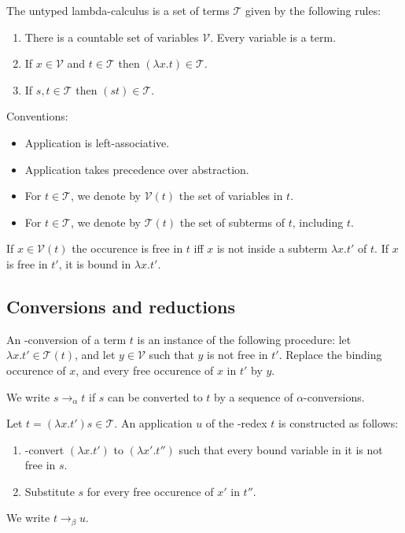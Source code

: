 \documentclass{article}
\begin{document}
\begin{definition}
	\label{untyped lcalc}
	The untyped lambda-calculus is a set of terms $\mathcal{T}$ given by the following rules:
	\begin{enumerate}[label=L\arabic*.]
		\item There is a countable set of variables $\mathcal{V}$. Every variable is a term.
		\item If $x\in\mathcal{V}$ and $t\in\mathcal{T}$ then $(\lambda x.t)\in\mathcal{T}$.
		\item \label{l3a} If $s,t\in\mathcal{T}$ then $(st)\in\mathcal{T}$.
	\end{enumerate}	
	Conventions:
	\begin{itemize}
		\item Application is left-associative. 
		\item Application takes precedence over abstraction.
		\item For $t\in\mathcal{T}$, we denote by $\mathcal{V}(t)$ the set of variables in $t$.
		\item For $t\in\mathcal{T}$, we denote by $\mathcal{T}(t)$ the set of subterms of $t$, including $t$.
	\end{itemize}
\end{definition}

\begin{definition*}
	If $x\in\mathcal{V}(t)$ the occurence is free in $t$ iff $x$ is not inside a subterm 
	$\lambda x.t'$ of $t$. If $x$ is free in $t'$, it is bound in $\lambda x.t'$.
\end{definition*}

\subsection{Conversions and reductions}

\begin{definition*}
	An \alpha-conversion of a term $t$ is an instance of the following procedure: let 
	$\lambda x.t'\in \mathcal{T}(t)$, and let $y\in\mathcal{V}$ such that $y$ is not free 
	in $t'$. Replace the binding occurence of $x$, and every free occurence of $x$ in $t'$
	by $y$.

	We write $s\to_\alpha t$ if $s$ can be converted to $t$ by a sequence of $\alpha$-conversions.
\end{definition*}

\begin{definition*}
	Let $t=(\lambda x.t')s\in\mathcal{T}$. An application $u$ of the \beta-redex $t$ is constructed as follows:
	\begin{enumerate}
		\item \alpha-convert $(\lambda x. t')$ to $(\lambda x'.t'')$ such that every bound variable in it is 
			not free in $s$.
		\item Substitute $s$ for every free occurence of $x'$ in $t''$.
	\end{enumerate}
	We write $t\to_\beta u$.
\end{definition*}
\end{document}
